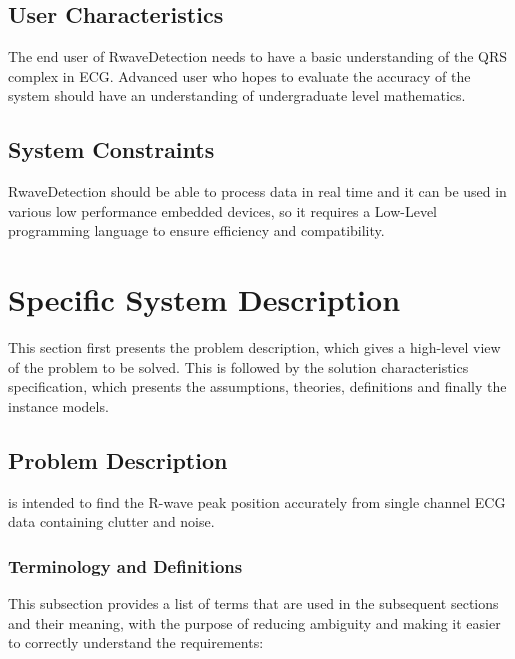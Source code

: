 \documentclass[12pt]{article}
\begin{document}
\subsection{User Characteristics} \label{SecUserCharacteristics}

The end user of RwaveDetection needs to have a basic understanding of the QRS
complex in ECG.  Advanced user who hopes to evaluate the accuracy of the system
should have an understanding of undergraduate level mathematics.

\subsection{System Constraints}

RwaveDetection should be able to process data in real time and it can be used in
various low performance embedded devices, so it requires a Low-Level programming
language to ensure efficiency and compatibility.

\section{Specific System Description}

This section first presents the problem description, which gives a high-level
view of the problem to be solved.  This is followed by the solution
characteristics specification, which presents the assumptions, theories,
definitions and finally the instance models.

\subsection{Problem Description} \label{Sec_pd}

\progname{} is intended to find the R-wave peak position accurately from single
channel ECG data containing clutter and noise.

\subsubsection{Terminology and  Definitions}

This subsection provides a list of terms that are used in the subsequent
sections and their meaning, with the purpose of reducing ambiguity and making it
easier to correctly understand the requirements:
\end{document}
